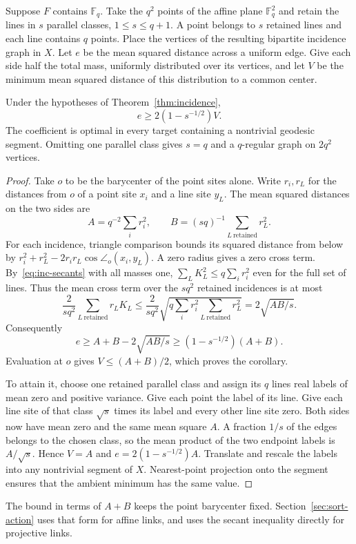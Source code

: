 Suppose $F$ contains $\mathbb F_q$. Take the $q^2$ points of the affine
plane $\mathbb F_q^2$ and retain the lines in $s$ parallel classes,
$1\le s\le q+1$. A point belongs to $s$ retained lines and each line
contains $q$ points. Place the vertices of the resulting bipartite
incidence graph in $X$. Let $e$ be the mean squared distance across a
uniform edge. Give each side half the total mass, uniformly distributed
over its vertices, and let $V$ be the minimum mean squared distance
of this distribution to a common center.

\begin{corollary}\label{cor:inc-link}
Under the hypotheses of Theorem~\ref{thm:incidence},
\[
                   e\ge 2(1-s^{-1/2}) V .
\]
The coefficient is optimal in every target containing a nontrivial
geodesic segment. Omitting one parallel class gives $s=q$ and a
$q$-regular graph on $2q^2$ vertices.
\end{corollary}

\begin{proof}
Take $o$ to be the barycenter of the point sites alone. Write $r_i,r_L$
for the distances from $o$ of a point site $x_i$ and a line site
$y_L$. The mean squared distances on the two sides are
\[
             A=q^{-2}\sum_i r_i^2,\qquad
             B=(sq)^{-1}\sum_{L\ \mathrm{retained}} r_L^2 .
\]
For each incidence, triangle comparison bounds its squared distance
from below by $r_i^2+r_L^2-2r_i r_L\cos\angle_o(x_i,y_L)$.
A zero radius gives a zero cross term. By~\eqref{eq:inc-secants}
with all masses one, $\sum_L K_L^2\le q\sum_i r_i^2$ even for the
full set of lines. Thus the mean cross term over the $s q^2$
retained incidences is at most
\[
 \frac{2}{s q^2}\sum_{L\ \mathrm{retained}}r_L K_L
        \le\frac{2}{s q^2}
           \sqrt{q\sum_i r_i^2\sum_{L\ \mathrm{retained}}r_L^2}
        = 2\sqrt{AB/s}.
\]
Consequently
\[
      e\ge A+B-2\sqrt{AB/s}\ge (1-s^{-1/2})(A+B).
\]
Evaluation at $o$ gives $V\le(A+B)/2$, which proves the corollary.

To attain it, choose one retained parallel class and assign its $q$
lines real labels of mean zero and positive variance. Give each point
the label of its line. Give each line site of that class $\sqrt s$
times its label and every other line site zero. Both sides now have
mean zero and the same mean square $A$. A fraction $1/s$ of the edges
belongs to the chosen class, so the mean product of the two endpoint
labels is $A/\sqrt s$. Hence $V=A$ and
$e=2(1-s^{-1/2})A$. Translate and rescale the labels into any
nontrivial segment of $X$. Nearest-point projection onto the segment
ensures that the ambient minimum has the same value.
\end{proof}

The bound in terms of $A+B$ keeps the point barycenter fixed.
Section~\ref{sec:sort-action} uses that form for affine links, and
uses the secant inequality directly for projective links.
